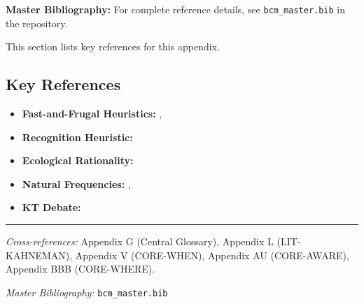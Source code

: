 \begin{tcolorbox}[colback=blue!5!white, colframe=blue!75!black]
\textbf{Master Bibliography:} For complete reference details, see
\texttt{bcm\_master.bib} in the repository.

This section lists key references for this appendix.
\end{tcolorbox}

\vspace{0.5em}

\subsection{Key References}

\begin{itemize}[nosep]
    \item \textbf{Fast-and-Frugal Heuristics:} \citet{PAP-gigerenzer1996fast}, \citet{PAP-gigerenzer1999simple}
    \item \textbf{Recognition Heuristic:} \citet{PAP-goldstein2002recognition}
    \item \textbf{Ecological Rationality:} \citet{gigerenzer2001bounded}
    \item \textbf{Natural Frequencies:} \citet{PAP-gigerenzer1995improve}, \citet{PAP-gigerenzer2007helping}
    \item \textbf{KT Debate:} \citet{PAP-gigerenzer1996narrow}
\end{itemize}

\nocite{bcm_master}



\vspace{1em}
\hrule
\vspace{0.5em}

\noindent\textit{Cross-references:}
Appendix G (Central Glossary),
Appendix L (LIT-KAHNEMAN),
Appendix V (CORE-WHEN),
Appendix AU (CORE-AWARE),
Appendix BBB (CORE-WHERE).

\noindent\textit{Master Bibliography:} \texttt{bcm\_master.bib}


